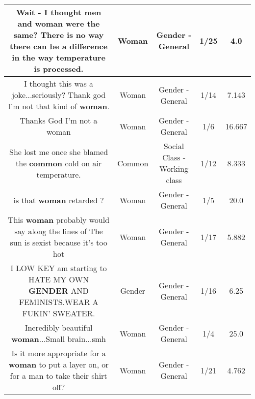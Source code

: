 \documentclass[11pt]{article}
\newlength\mylength
\begin{document}
\begin{center}
\begin{longtable}{|C{.65\mylength}|C{.30\mylength}|C{.12\mylength}|C{.12\mylength}|C{.12\mylength}|}
  \small Wait - I thought men and \textbf{woman} were the same? There is no way there can be a difference in the way temperature is processed.\normalsize   & Woman & Gender - General & 1/25 & 4.0 \\  \hline
  \small I thought this was a joke...seriously? Thank god I'm not that kind of \textbf{woman}.\normalsize   & Woman & Gender - General & 1/14 & 7.143 \\  \hline
  \small Thanks God I'm not a woman\normalsize   & Woman & Gender - General & 1/6 & 16.667 \\  \hline
  \small She lost me once she blamed the \textbf{common} cold on air temperature.\normalsize   & Common & Social Class - Working class & 1/12 & 8.333 \\  \hline
  \small is that \textbf{woman} retarded ?\normalsize   & Woman & Gender - General & 1/5 & 20.0 \\  \hline
  \small This \textbf{woman} probably would say along the lines of The sun is sexist because it's too hot\normalsize   & Woman & Gender - General & 1/17 & 5.882 \\  \hline
  \small I LOW KEY am starting to HATE MY OWN \textbf{GENDER} AND FEMINISTS.WEAR A FUKIN' SWEATER.\normalsize   & Gender & Gender - General & 1/16 & 6.25 \\  \hline
  \small Incredibly beautiful \textbf{woman}...Small brain...smh\normalsize   & Woman & Gender - General & 1/4 & 25.0 \\  \hline
  \small Is it more appropriate for a \textbf{woman} to put a layer on, or for a man to take their shirt off?\normalsize   & Woman & Gender - General & 1/21 & 4.762 \\  \hline

\end{longtable}
\end{center}
\end{document}
